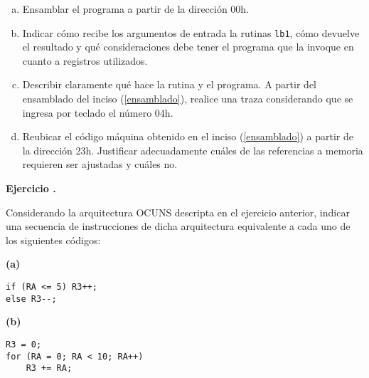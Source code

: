\documentclass[12pt,a4paper]{article}
\newcounter{ctej}
\newcommand{\ejercicio}{\vspace{1em}\noindent\textbf{Ejercicio \arabic{ctej}.} \addtocounter{ctej}{1}}
\begin{document}
\begin{enumerate}[a)]\itemsep0pt
\item Ensamblar el programa a partir de la dirección 00h. \label{ensamblado}

\item Indicar cómo recibe los argumentos de entrada la rutinas \texttt{lb1}, cómo devuelve el resultado y qué consideraciones debe tener el programa que la invoque en cuanto a registros utilizados.

\item Describir claramente qué hace la rutina y el programa. A partir del ensamblado del inciso (\ref{ensamblado}), realice una traza considerando que se ingresa por teclado el número 04h.

\item Reubicar el código máquina obtenido en el inciso (\ref{ensamblado}) a partir de la dirección 23h. Justificar adecuadamente cuáles de las referencias a memoria requieren ser ajustadas y cuáles no.

\end{enumerate}


\ejercicio Considerando la arquitectura OCUNS descripta en el ejercicio anterior, indicar una secuencia de instrucciones de dicha arquitectura equivalente a cada uno de los siguientes códigos:

\begin{center}
\noindent\textbf{(a)}
\begin{minipage}[t]{0.2\textwidth}\small
\begin{verbatim}
if (RA <= 5) R3++;
else R3--;
\end{verbatim}
\end{minipage}
\qquad
\textbf{(b)}
\begin{minipage}[t]{0.25\textwidth}\small
\begin{verbatim}
R3 = 0;
for (RA = 0; RA < 10; RA++)
    R3 += RA;

\end{verbatim}
\end{minipage}
\end{center}
\end{document}
